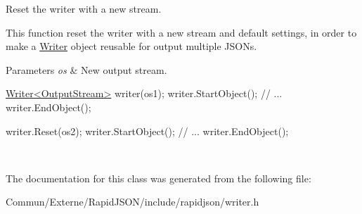 Reset the writer with a new stream. 

This function reset the writer with a new stream and default settings, in order to make a \hyperlink{class_writer}{Writer} object reusable for output multiple J\+S\+O\+Ns.


\begin{DoxyParams}{Parameters}
{\em os} & New output stream. 
\begin{DoxyCode}
\hyperlink{class_writer}{Writer<OutputStream>} writer(os1);
writer.StartObject();
\textcolor{comment}{// ...}
writer.EndObject();

writer.Reset(os2);
writer.StartObject();
\textcolor{comment}{// ...}
writer.EndObject();
\end{DoxyCode}
 \\
\hline
\end{DoxyParams}


The documentation for this class was generated from the following file\+:\begin{DoxyCompactItemize}
\item 
Commun/\+Externe/\+Rapid\+J\+S\+O\+N/include/rapidjson/writer.\+h\end{DoxyCompactItemize}
